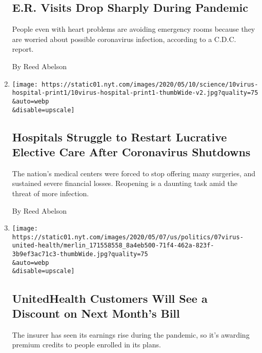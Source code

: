 \begin{enumerate}
{  \subsection{E.R. Visits Drop Sharply During
  Pandemic}\label{er-visits-drop-sharply-during-pandemic}}

  People even with heart problems are avoiding emergency rooms because
  they are worried about possible coronavirus infection, according to a
  C.D.C. report.

  By Reed Abelson
\item
  \href{/2020/05/09/health/hospitals-coronavirus-reopening.html}{}

  \texttt{[image: https://static01.nyt.com/images/2020/05/10/science/10virus-hospital-print1/10virus-hospital-print1-thumbWide-v2.jpg?quality=75\\\&auto=webp\\\&disable=upscale]}

  \hypertarget{hospitals-struggle-to-restart-lucrative-elective-care-after-coronavirus-shutdowns}{%
  \subsection{Hospitals Struggle to Restart Lucrative Elective Care
  After Coronavirus
  Shutdowns}\label{hospitals-struggle-to-restart-lucrative-elective-care-after-coronavirus-shutdowns}}

  The nation's medical centers were forced to stop offering many
  surgeries, and sustained severe financial losses. Reopening is a
  daunting task amid the threat of more infection.

  By Reed Abelson
\item
  \href{/2020/05/07/health/unitedhealth-coronavirus.html}{}

  \texttt{[image: https://static01.nyt.com/images/2020/05/07/us/politics/07virus-united-health/merlin\_171558558\_8a4eb500-71f4-462a-823f-3b9ef3ac71c3-thumbWide.jpg?quality=75\\\&auto=webp\\\&disable=upscale]}

  \hypertarget{unitedhealth-customers-will-see-a-discount-on-next-months-bill}{%
  \subsection{UnitedHealth Customers Will See a Discount on Next Month's
  Bill}\label{unitedhealth-customers-will-see-a-discount-on-next-months-bill}}

  The insurer has seen its earnings rise during the pandemic, so it's
  awarding premium credits to people enrolled in its plans.


\end{enumerate}
